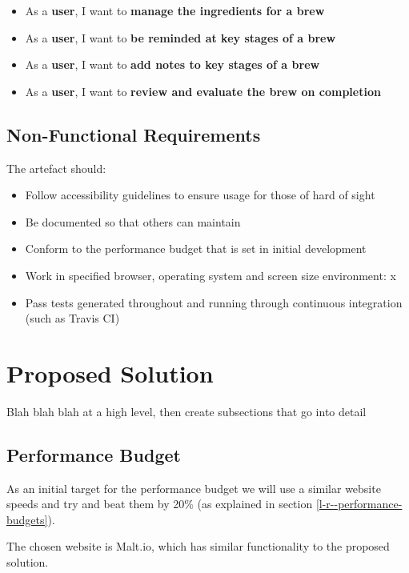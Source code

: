 \begin{itemize}
  \item As a \textbf{user}, I want to \textbf{manage the ingredients for a brew}
  \item As a \textbf{user}, I want to \textbf{be reminded at key stages of a brew}
  \item As a \textbf{user}, I want to \textbf{add notes to key stages of a brew}
  \item As a \textbf{user}, I want to \textbf{review and evaluate the brew on completion}
\end{itemize}

\subsection{Non-Functional Requirements} \label{a-d--requirements--non-functional}

The artefact should:

\begin{itemize}
  \item Follow accessibility guidelines to ensure usage for those of hard of sight
  \item Be documented so that others can maintain
  \item Conform to the performance budget that is set in initial development
  \item Work in specified browser, operating system and screen size environment: x
  \item Pass tests generated throughout and running through continuous integration (such as Travis CI)
\end{itemize}

\section{Proposed Solution} \label{a-d--proposed-solution}

Blah blah blah at a high level, then create subsections that go into detail

\subsection{Performance Budget}

As an initial target for the performance budget we will use a similar website speeds and try and beat them by 20\% (as explained in section \ref{l-r--performance-budgets}).

The chosen website is Malt.io, which has similar functionality to the proposed solution.

